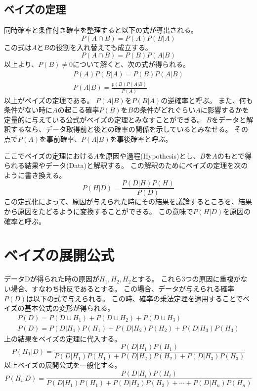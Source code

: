 \documentclass{ltjsarticle}
\begin{document}
\subsection{ベイズの定理}
同時確率と条件付き確率を整理すると以下の式が導出される。
\begin{equation}
    P(A \cap B)=P(A) P(B|A)
\end{equation}
この式は$A$と$B$の役割を入れ替えても成立する。
\begin{equation}
    P(A \cap B)=P(B) P(A|B)
\end{equation}
以上より、$P(B)\not=0$について解くと、次の式が得られる。
\begin{eqnarray}
    P(A) P(B|A) = P(B) P(A|B) \\
    P(A|B) = \frac{p(B)P(A|B)}{P(A)}
\end{eqnarray}
以上がベイズの定理である。
$P(A|B)$を$P(B|A)$の逆確率と呼ぶ。
また、何も条件がない時に$A$の起こる確率$P(B)$を$B$の条件がどれぐらい$A$に影響するかを定量的に与えている公式がベイズの定理とみなすことができる。
$B$をデータと解釈するなら、データ取得前と後との確率の関係を示しているとみなせる。
その点で$P(A)$を事前確率、$P(A|B)$を事後確率と呼ぶ。

ここでベイズの定理における$A$を原因や過程(Hypothesis)とし、$B$を$A$のもとで得られる結果やデータ(Data)と解釈する。
この解釈のためにベイズの定理を次のように書き換える。
\begin{equation}
    P(H|D)=\frac{P(D|H)P(H)}{P(D)}
\end{equation}
この定式化によって、原因が与えられた時にその結果を議論するところを、結果から原因をたどるように変換することができる。
この意味で$P(H|D)$を原因の確率と呼ぶ。

\section{ベイズの展開公式}
データDが得られた時の原因が$H_1, H_2, H_2$とする。
これら3つの原因に重複がない場合、すなわち排反であるとする。
この場合、データが与えられる確率$P(D)$は以下の式で与えられる。
この時、確率の乗法定理を適用することでベイズの基本公式の変形が得られる。
\begin{eqnarray}
    P(D)=P(D \cup H_1) + P(D \cup H_2) + P(D \cup H_3) \\
    P(D)=P(D|H_1) P(H_1) + P(D|H_2) P(H_2) + P(D|H_3) P(H_3)
\end{eqnarray}
上の結果をベイズの定理に代入する。
\begin{equation}
    P(H_1|D) = \frac{P(D|H_1)P(H_1)}{P(D|H_1) P(H_1) + P(D|H_2) P(H_2) + P(D|H_3) P(H_3)}
\end{equation}
以上ベイズの展開公式を一般化する。
\begin{equation}
    P(H_i|D) = \frac{P(D|H_i)P(H_i)}{P(D|H_1) P(H_1) + P(D|H_2) P(H_2) + \cdots + P(D|H_n) P(H_n)}
\end{equation}
\end{document}
